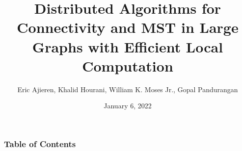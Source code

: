 \documentclass{beamer}
\title{Distributed Algorithms for Connectivity and MST in Large Graphs with Efficient Local Computation}
\author{Eric Ajieren, \alert{Khalid Hourani}, William K. Moses Jr., Gopal Pandurangan}
\date{January 6, 2022}
\institute{University of Houston}
\begin{document}
\frame{\titlepage}

\begin{frame}
    \frametitle{Table of Contents}
    \tableofcontents
\end{frame}



% 



\end{document}
